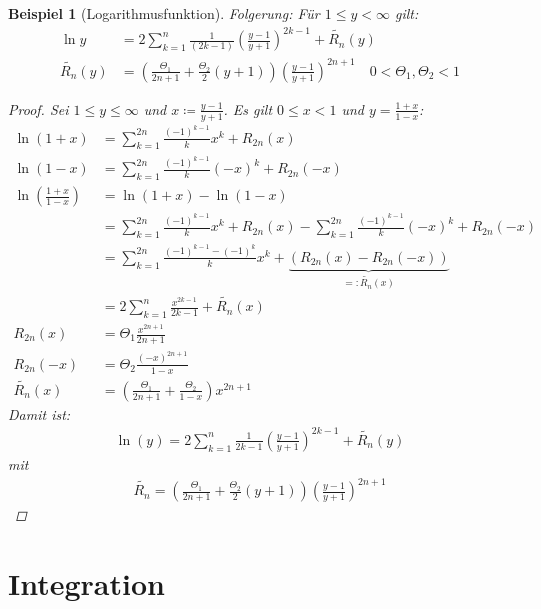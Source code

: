 \documentclass[ngerman,titlepage,twoside, parskip=half*]{scrreprt}
\theoremstyle{break}
\theoremstyle{nonumberbreak}
\newtheorem{beispiel}{Beispiel}
\newtheorem{proof}{Beweis:}
\begin{document}
\begin{beispiel}[Logarithmusfunktion]
  Folgerung: Für $1\leq y<\infty$ gilt:
  \begin{align*}
    \ln y &= 2\sum_{k=1}^n \frac{1}{(2k-1)}\left(\frac{y-1}{y+1}\right)^{2k-1}
    +\widetilde{R_n}(y)\\
    \widetilde{R_n}(y) &= \left(\frac{\Theta_1}{2n+1}+
      \frac{\Theta_2}{2}(y+1)\right)
    \left(\frac{y-1}{y+1}\right)^{2n+1}\quad 0<\Theta_1,\Theta_2<1
  \end{align*}
  \begin{proof}
    Sei $1\leq y \leq\infty$ und $x\coloneqq\frac{y-1}{y+1}$. Es gilt
    $0\leq x<1$ und $y=\frac{1+x}{1-x}$:
    \begin{align*}
      \ln(1+x) &= \sum_{k=1}^{2n}\frac{(-1)^{k-1}}{k} x^k+ R_{2n}(x)\\
      \ln(1-x) &= \sum_{k=1}^{2n}\frac{(-1)^{k-1}}{k}(-x)^k+R_{2n}(-x)\\
      \ln\left(\frac{1+x}{1-x}\right) &= \ln(1+x)-\ln(1-x)\\
      &= \sum_{k=1}^{2n} \frac{(-1)^{k-1}}{k}x^k+R_{2n}(x)-
      \sum_{k=1}^{2n}\frac{(-1)^{k-1}}{k}(-x)^k+R_{2n}(-x)\\
      &= \sum_{k=1}^{2n}\frac{(-1)^{k-1}-(-1)^{k}}{k} x^k+
      \underbrace{(R_{2n} (x)-R_{2n}(-x))}_{=\colon\widetilde{R_n}(x)}\\
      &= 2\sum_{k=1}^n \frac{x^{2k-1}}{2k-1} +\widetilde{R_n}(x)\\
      R_{2n}(x)&= \Theta_1\frac{x^{2n+1}}{2n+1}\\
      R_{2n}(-x)&= \Theta_2\frac{(-x)^{2n+1}}{1-x}\\
      \widetilde{R_n}(x)&= \left(\frac{\Theta_1}{2n+1}+
        \frac{\Theta_2}{1-x}\right) x^{2n+1}
    \end{align*}
    Damit ist:
    \begin{gather*}
      \boxed{\ln(y)=2\sum_{k=1}^n\frac{1}{2k-1}\left( \frac{y-1}{y+1}
        \right)^{2k-1} +\widetilde{R_n}(y)}
    \end{gather*}
    mit
    \begin{gather*}
      \boxed{\widetilde{R_n}=\left(
          \frac{\Theta_1}{2n+1}+\frac{\Theta_2}{2} (y+1)\right)\left(
          \frac{y-1}{y+1} \right)^{2n+1}}
    \end{gather*}
  \end{proof}
\end{beispiel}

\chapter{Integration}
\end{document}
